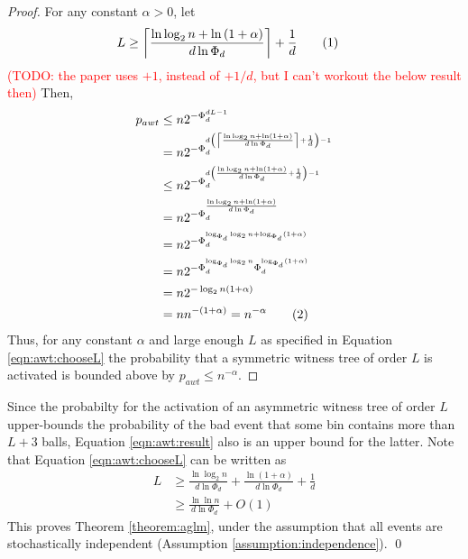 \documentclass[a4paper,12pt]{article}
\newcommand\todo[1]{\textcolor{red}{(TODO: #1)}}
\newcommand\numberthis{\addtocounter{equation}{1}\tag{\theequation}}
\newcommand\neqn[1]{\numberthis\label{eqn:#1}}
\begin{document}
\begin{proof}
For any constant $\alpha > 0$, let 
\begin{align*}
L &\geq \left\lceil{\frac{\ln\log_2 n + \ln\left(1+\alpha\right)}{d \ln \Phi_d}}\right\rceil+\frac{1}{d} \neqn{awt:chooseL}
\end{align*}
\todo{the paper uses $+1$, instead of $+1/d$, but I can't workout the below result then} 
Then, 
\begin{align*}
p_{awt} &\leq n  2^{-\Phi_d^{d L -1}} \\
        &= n  2^{-\Phi_d^{d \left(\left\lceil{\frac{\ln\log_2 n + \ln\left(1+\alpha\right)}{d \ln \Phi_d}}\right\rceil+\frac{1}{d}\right) -1}} \\
        &\leq n  2^{-\Phi_d^{d \left({\frac{\ln\log_2 n + \ln\left(1+\alpha\right)}{d \ln \Phi_d}}+\frac{1}{d}\right) -1}} \\
        &= n  2^{-\Phi_d^{{\frac{\ln\log_2 n + \ln\left(1+\alpha\right)}{d \ln \Phi_d}}}} \\
        &= n  2^{-\Phi_d^{\log_{\Phi_d}\log_2 n + \log_{\Phi_d}\left(1+\alpha\right)}} \\
         &= n  2^{-\Phi_d^{\log_{\Phi_d}\log_2 n} \Phi_d^{ \log_{\Phi_d}\left(1+\alpha\right)}} \\
         &= n  2^{-\log_2 n \left(1+\alpha\right)} \\
         &= n  n ^{-(1+\alpha)} = n^{-\alpha} \neqn{awt:result}
\end{align*}
Thus, for any constant $\alpha$ and large enough $L$ as specified in Equation \ref{eqn:awt:chooseL} the probability that a symmetric witness tree of order $L$ is activated is bounded above by $p_{awt }\leq n^{-\alpha}$.
\end{proof}

Since the probabilty for the activation of an asymmetric witness tree of order $L$ upper-bounds the probability of the bad event that some bin contains more than $L+3$ balls, Equation \ref{eqn:awt:result} also is an upper bound for the latter. Note that Equation \ref{eqn:awt:chooseL} can be written as
\begin{align*}
L &\geq \frac{\ln\log_2 n}{d \ln \Phi_d} + \frac{\ln\left(1+\alpha\right)}{d \ln \Phi_d} + \frac{1}{d}\\
  &\geq \frac{\ln\ln n}{d \ln \Phi_d} + O\left(1\right)
\end{align*}
This proves Theorem \ref{theorem:aglm}, under the assumption that all events are stochastically independent (Assumption \ref{assumption:independence}). \qed
\end{document}
